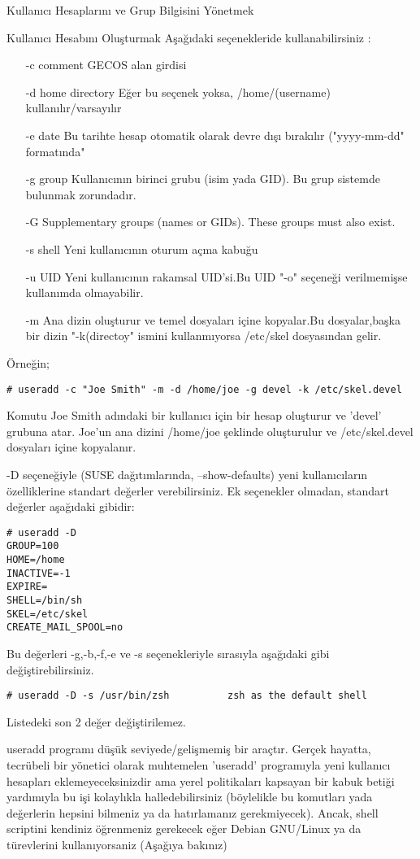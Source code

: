 \begin{section}{Kullanıcı Hesaplarını ve Grup Bilgisini Yönetmek}
\begin{subsection}{Kullanıcı Hesabını Oluşturmak}
Aşağıdaki seçenekleride kullanabilirsiniz :
\begin{itemize}
\item[-c]comment GECOS alan girdisi
\item[-d]home directory Eğer bu seçenek yoksa, /home/(username) kullanılır/varsayılır
\item[-e]date Bu tarihte hesap otomatik olarak devre dışı bırakılır ("yyyy-mm-dd" formatında"
\item[-g]group Kullanıcının birinci grubu (isim yada GID). Bu grup sistemde bulunmak zorundadır.
\item[-G]Supplementary groups (names or GIDs). These groups must also exist.
\item[-s]shell Yeni kullanıcının oturum açma kabuğu
\item[-u]UID Yeni kullanıcının rakamsal UID'si.Bu UID "-o" seçeneği verilmemişse kullanımda olmayabilir.
\item[-m]Ana dizin oluşturur ve temel dosyaları içine kopyalar.Bu dosyalar,başka bir dizin "-k(directoy" ismini kullanmıyorsa /etc/skel dosyasından gelir.
\end{itemize}
Örneğin;
\begin{verbatim}
# useradd -c "Joe Smith" -m -d /home/joe -g devel -k /etc/skel.devel
\end{verbatim}

Komutu Joe Smith adındaki bir kullanıcı için bir hesap oluşturur ve 'devel' grubuna atar. Joe'un ana dizini /home/joe şeklinde oluşturulur ve /etc/skel.devel dosyaları içine kopyalanır.

-D seçeneğiyle (SUSE dağıtımlarında, --show-defaults) yeni kullanıcıların özelliklerine standart değerler verebilirsiniz. Ek seçenekler olmadan, standart değerler aşağıdaki gibidir:
\begin{verbatim}
# useradd -D
GROUP=100
HOME=/home
INACTIVE=-1
EXPIRE=
SHELL=/bin/sh
SKEL=/etc/skel
CREATE_MAIL_SPOOL=no
\end{verbatim}

Bu değerleri -g,-b,-f,-e ve -s seçenekleriyle sırasıyla aşağıdaki gibi değiştirebilirsiniz.
\begin{verbatim}
# useradd -D -s /usr/bin/zsh          zsh as the default shell
\end{verbatim}

	Listedeki son 2 değer değiştirilemez.

useradd programı düşük seviyede/gelişmemiş bir araçtır. Gerçek hayatta, tecrübeli bir yönetici olarak muhtemelen 'useradd' programıyla yeni kullanıcı hesapları eklemeyeceksinizdir ama yerel politikaları kapsayan bir kabuk betiği yardımıyla bu işi kolaylıkla halledebilirsiniz (böylelikle bu komutları yada değerlerin hepsini bilmeniz ya da hatırlamanız gerekmiyecek). Ancak, shell scriptini kendiniz öğrenmeniz gerekecek eğer Debian GNU/Linux ya da türevlerini kullanıyorsaniz (Aşağıya bakınız)


\end{subsection}
\end{section}
